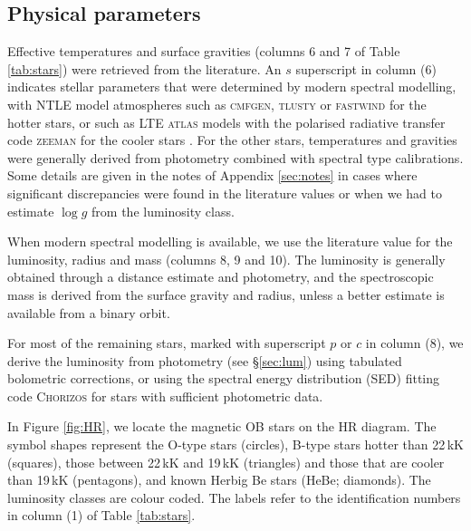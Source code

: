 \documentclass[useAMS,usenatbib]{mn2e}
\newcommand{\logg}{\log g}
\begin{document}
\subsection{Physical parameters}
\label{sec:physical}


Effective temperatures and surface gravities (columns 6 and 7 of Table \ref{tab:stars}) were retrieved from the literature.
An $s$ superscript in column (6) indicates stellar parameters that were determined by modern spectral modelling, with NTLE model atmospheres such as \textsc{cmfgen}, \textsc{tlusty} or \textsc{fastwind} for the hotter stars, or such as LTE \textsc{atlas} models with the polarised radiative transfer code \textsc{zeeman} for the cooler stars \citep{1998ApJ...496..407H,2003ApJS..146..417L,2005A&A...435..669P,1979ApJS...40....1K,1988ApJ...326..967L,2001A&A...374..265W}.
For the other stars, temperatures and gravities were generally derived from photometry combined with spectral type calibrations. 
Some details are given in the notes of Appendix \ref{sec:notes} in cases where significant discrepancies were found in the literature values or when we had to estimate $\logg$ from the luminosity class.

When modern spectral modelling is available, we use the literature value for the luminosity, radius and mass (columns 8, 9 and 10). 
The luminosity is generally obtained through a distance estimate and photometry, and the spectroscopic mass is derived from the surface gravity and radius, unless a better estimate is available from a binary orbit. 

For most of the remaining stars, marked with superscript $p$ or $c$ in column (8), we derive the luminosity from photometry (see \S \ref{sec:lum}) using tabulated bolometric corrections, or using the spectral energy distribution (SED) fitting code \textsc{Chorizos} \citep{2004PASP..116..859M} for stars with sufficient photometric data. 

In Figure \ref{fig:HR}, we locate the magnetic OB stars on the HR diagram. The symbol shapes represent the O-type stars (circles), B-type stars hotter than 22\,kK (squares), those between 22\,kK and 19\,kK (triangles) and those that are cooler than 19\,kK (pentagons), and known Herbig Be stars (HeBe; diamonds). The luminosity classes are colour coded. 
The labels refer to the identification numbers in column (1) of Table \ref{tab:stars}. 
\end{document}
